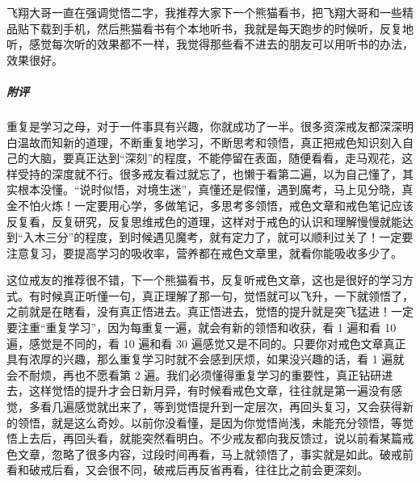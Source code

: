 \begin{case}
    飞翔大哥一直在强调觉悟二字，我推荐大家下一个熊猫看书，把飞翔大哥和一些精品贴下载到手机，然后熊猫看书有个本地听书，我就是每天跑步的时候听，反复地听，感觉每次听的效果都不一样，我觉得那些看不进去的朋友可以用听书的办法，效果很好。
    \subparagraph{附评} 重复是学习之母，对于一件事具有兴趣，你就成功了一半。很多资深戒友都深深明白温故而知新的道理，不断重复地学习，不断思考和领悟，真正把戒色知识刻入自己的大脑，要真正达到“深刻”的程度，不能停留在表面，随便看看，走马观花，这样受持的深度就不行。很多戒友看过就忘了，也懒于看第二遍，以为自己懂了，其实根本没懂。“说时似悟，对境生迷”，真懂还是假懂，遇到魔考，马上见分晓，真金不怕火炼！一定要用心学，多做笔记，多思考多领悟，戒色文章和戒色笔记应该反复看，反复研究，反复思维戒色的道理，这样对于戒色的认识和理解慢慢就能达到“入木三分”的程度，到时候遇见魔考，就有定力了，就可以顺利过关了！一定要注意复习，要提高学习的吸收率，营养都在戒色文章里，就看你能吸收多少了。

    这位戒友的推荐很不错，下一个熊猫看书，反复听戒色文章，这也是很好的学习方式。有时候真正听懂一句，真正理解了那一句，觉悟就可以飞升，一下就领悟了，之前就是在瞎看，没有真正悟进去。真正悟进去，觉悟的提升就是突飞猛进！一定要注重“重复学习”，因为每重复一遍，就会有新的领悟和收获，看 1 遍和看 10 遍，感觉是不同的，看 10 遍和看 30 遍感觉又是不同的。只要你对戒色文章真正具有浓厚的兴趣，那么重复学习时就不会感到厌烦，如果没兴趣的话，看 1 遍就会不耐烦，再也不愿看第 2 遍。我们必须懂得重复学习的重要性，真正钻研进去，这样觉悟的提升才会日新月异，有时候看戒色文章，往往就是第一遍没有感觉，多看几遍感觉就出来了，等到觉悟提升到一定层次，再回头复习，又会获得新的领悟，就是这么奇妙。以前你没看懂，是因为你觉悟尚浅，未能充分领悟，等觉悟上去后，再回头看，就能突然看明白。不少戒友都向我反馈过，说以前看某篇戒色文章，忽略了很多内容，过段时间再看，马上就领悟了，事实就是如此。破戒前看和破戒后看，又会很不同，破戒后再反省再看，往往比之前会更深刻。
\end{case}

